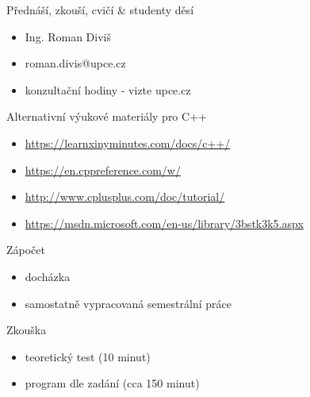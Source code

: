 

\begin{frame}[fragile]
\begin{block}{Přednáší, zkouší, cvičí \& studenty děsí}
\begin{itemize}
\item Ing. Roman Diviš
\item roman.divis@upce.cz
\item konzultační hodiny - vizte upce.cz
\end{itemize}
\end{block}

\end{frame}


\begin{frame}[fragile]
\begin{block}{Alternativní výukové materiály pro C++}
\begin{itemize}
\item \url{https://learnxinyminutes.com/docs/c++/}
\item \url{https://en.cppreference.com/w/}
\item \url{http://www.cplusplus.com/doc/tutorial/}
\item \url{https://msdn.microsoft.com/en-us/library/3bstk3k5.aspx}
\end{itemize}
\end{block}
\end{frame}


\begin{frame}[fragile]
\begin{block}{Zápočet}
\begin{itemize}
\item docházka
\item samostatně vypracovaná semestrální práce
\end{itemize}
\end{block}

\begin{block}{Zkouška}
\begin{itemize}
\item teoretický test (10 minut)
\item program dle zadání (cca 150 minut)
\end{itemize}
\end{block}
\end{frame}



